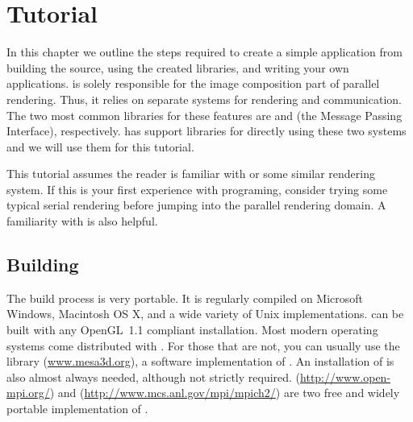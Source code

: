 
\chapter{Tutorial}
\label{chap:Tutorial}

In this chapter we outline the steps required to create a simple \IceT
application from building the \IceT source, using the created libraries,
and writing your own applications.  \IceT is solely responsible for the
image composition part of parallel rendering.  Thus, it relies on separate
systems for rendering and communication.  The two most common libraries
for these features are  and
 (the Message Passing Interface), respectively.
\IceT has support libraries for directly using these two systems and we
will use them for this tutorial.

This tutorial assumes the reader is familiar with \OpenGL or some similar
rendering system.  If this is your first experience with \OpenGL programing,
consider trying some typical serial rendering before jumping into the
parallel rendering domain.  A familiarity with \MPI is also helpful.

\section{Building \IceT}
\label{sec:Tutorial:Building_IceT}

The \IceT build process is very portable.  It is regularly compiled on
Microsoft Windows, Macintosh OS X, and a wide variety of Unix
implementations.  \IceT can be built with any OpenGL~1.1
compliant installation.  Most modern operating systems come distributed
with \OpenGL.  For those that are not, you can usually use the
 library
(\href{www.mesa3d.org}{www.mesa3d.org}), a software implementation of
\OpenGL.  An installation of \MPI is also almost always needed, although
not strictly required.  
(\href{http://www.open-mpi.org/}{http://www.open-mpi.org/}) and
(\href{http://www.mcs.anl.gov/mpi/mpich2/}{http://www.mcs.anl.gov/mpi/mpich2/})
are two free and widely portable implementation of \MPI.

